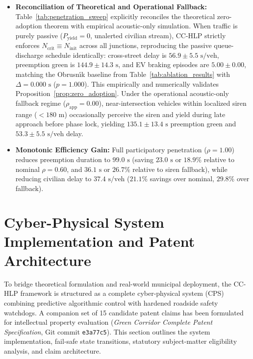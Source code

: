 \documentclass[journal,10pt,twocolumn]{IEEEtran}
\begin{document}
\begin{itemize}
    \item \textbf{Reconciliation of Theoretical and Operational Fallback:} Table~\ref{tab:penetration_sweep} explicitly reconciles the theoretical zero-adoption theorem with empirical acoustic-only simulation. When traffic is purely passive ($P_{\text{yield}} = 0$, unalerted civilian stream), CC-HLP strictly enforces $N_{\text{crit}} \equiv N_{\text{init}}$ across all junctions, reproducing the passive queue-discharge schedule identically: cross-street delay is $56.9 \pm 5.5\text{ s/veh}$, preemption green is $144.9 \pm 14.3\text{ s}$, and EV braking episodes are $5.00 \pm 0.00$, matching the Obrusn\'{\i}k baseline from Table~\ref{tab:ablation_results} with $\Delta = 0.000\text{ s}$ ($p = 1.000$). This empirically and numerically validates Proposition~\ref{prop:zero_adoption}. Under the operational acoustic-only fallback regime ($\rho_{\text{app}} = 0.00$), near-intersection vehicles within localized siren range ($<180\text{ m}$) occasionally perceive the siren and yield during late approach before phase lock, yielding $135.1 \pm 13.4\text{ s}$ preemption green and $53.3 \pm 5.5\text{ s/veh}$ delay.
    \item \textbf{Monotonic Efficiency Gain:} Full participatory penetration ($\rho = 1.00$) reduces preemption duration to $99.0\text{ s}$ (saving $23.0\text{ s}$ or $18.9\%$ relative to nominal $\rho = 0.60$, and $36.1\text{ s}$ or $26.7\%$ relative to siren fallback), while reducing civilian delay to $37.4\text{ s/veh}$ ($21.1\%$ savings over nominal, $29.8\%$ over fallback).
\end{itemize}

\section{Cyber-Physical System Implementation and Patent Architecture}
\label{sec:patent_architecture}

To bridge theoretical formulation and real-world municipal deployment, the CC-HLP framework is structured as a complete cyber-physical system (CPS) combining predictive algorithmic control with hardened roadside safety watchdogs. A companion set of 15 candidate patent claims has been formulated for intellectual property evaluation (\emph{Green Corridor Complete Patent Specification}, Git commit \texttt{e3a77c5}). This section outlines the system implementation, fail-safe state transitions, statutory subject-matter eligibility analysis, and claim architecture.
\end{document}
